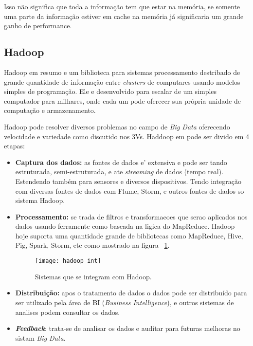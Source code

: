 Isso não significa que toda a informação tem que estar na memória, se somente uma parte da informação estiver em cache na memória já significaria um grande ganho de performance.~\cite{realtime}

\subsection{Hadoop}
Hadoop em resumo e um biblioteca para sistemas processamento destribado de grande quantidade de informação entre \textit{clusters} de computares usando modelos simples de programação. Ele e desenvolvido para escalar de um simples computador para milhares, onde cada um pode oferecer sua própria unidade de computação e armazenamento.~\cite{hadoop}

Hadoop pode resolver diversos problemas no campo de \textit{Big Data} oferecendo velocidade e variedade como discutido nos 3Vs. Haddoop em pode ser divido em 4 etapas:~\cite{hadoopessentials}
\begin{itemize}
	\item \textbf{Captura dos dados:} as fontes de dados e' extensiva e pode ser tando estruturada, semi-estruturada, e ate \textit{streaming} de dados (tempo real). Estendendo também para sensores e diversos dispositivos. Tendo integração com diversas fontes de dados com Flume, Storm, e outros fontes de dados so sistema Hadoop.
	\item \textbf{Processamento:} se trada de filtros e transformacoes que serao aplicados  nos dados usando ferramente como baseada na ligica do MapReduce. Hadoop hoje suporta uma quantidade grande de bibliotecas como MapReduce, Hive, Pig, Spark, Storm, etc como mostrado na figura ~\ref{fig:hadoopint}.
	\begin{figure}[!h]
		\caption{\label{fig:hadoopint} Sistemas que se integram com Hadoop.}
		\begin{center}
			\texttt{[image: hadoop\_int]}
		\end{center}
	\end{figure}
	\item \textbf{Distribuição:} apos o tratamento de dados o dados pode ser distribuído para ser utilizado pela área de BI (\textit{Business Intelligence}), e outros sistemas de analises podem consultar os dados.
	\item \textbf{\textit{Feedback}}: trata-se de analisar os dados e auditar para futuras melhoras no sistam \textit{Big Data}.
\end{itemize}

